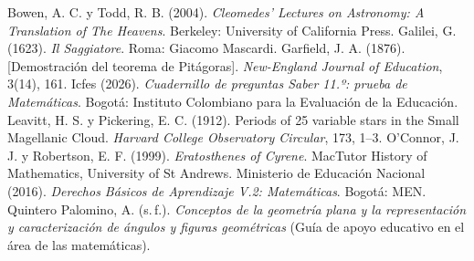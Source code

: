 \documentclass[11pt]{article}
\begin{document}
\begin{referencias}
 Bowen, A. C. y Todd, R. B. (2004). \emph{Cleomedes' Lectures on
  Astronomy: A Translation of The Heavens}. Berkeley: University of California Press.
 Galilei, G. (1623). \emph{Il Saggiatore}. Roma: Giacomo Mascardi.
 Garfield, J. A. (1876). [Demostración del teorema de Pitágoras].
  \emph{New-England Journal of Education}, 3(14), 161.
 Icfes (2026). \emph{Cuadernillo de preguntas Saber 11.º: prueba de
  Matemáticas}. Bogotá: Instituto Colombiano para la Evaluación de la Educación.
 Leavitt, H. S. y Pickering, E. C. (1912). Periods of 25 variable
  stars in the Small Magellanic Cloud. \emph{Harvard College Observatory Circular},
  173, 1--3.
 O'Connor, J. J. y Robertson, E. F. (1999).
  \emph{Eratosthenes of Cyrene}. MacTutor History of Mathematics, University of St Andrews.
 Ministerio de Educación Nacional (2016). \emph{Derechos Básicos de
  Aprendizaje V.2: Matemáticas}. Bogotá: MEN.
 Quintero Palomino, A. (s.\,f.). \emph{Conceptos de la geometría plana y
  la representación y caracterización de ángulos y figuras geométricas} (Guía de apoyo
  educativo en el área de las matemáticas).
\end{referencias}
\end{document}
